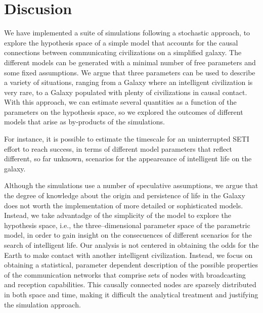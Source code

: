 \documentclass[crop]{CSLB}
\begin{document}
\maketitle




                      




\section{Discusion}\label{S_discussion}

We have implemented a suite of simulations following a stochastic
approach, to explore the hypothesis space of a simple model that
accounts for the causal connections between communicating
civilizations on a simplified galaxy.
%
The different models can be generated with a minimal number of free
parameters and some fixed assumptions.
%
We argue that three parameters can be used to describe a variety of
situations, ranging from a Galaxy where an intelligent civilization is
very rare, to a Galaxy populated with plenty of civilizations in
causal contact.
%
With this approach, we can estimate several quantities as a function
of the parameters on the hypothesis space,
so we explored the outcomes of different models 
that arise as by-products of the simulations.

%
For instance, it is possible to estimate the timescale for an
uninterrupted SETI effort to reach success, in terms of different
model parameters that reflect different, so far unknown, scenarios for
the appeareance of intelligent life on the galaxy.


Although the simulations use a number of speculative assumptions, we
argue that the degree of knowledge about the origin and persistence of
life in the Galaxy does not worth the implementation of more detailed
or sophisticated models.
%
Instead, we take advantadge of the simplicity of the model to explore
the hypothesis space, i.e., the three--dimensional parameter space of
the parametric model, in order to gain insight on the consecuences of
different scenarios for the search of intelligent life.
%
Our analysis is not centered in obtaining the odds for the Earth
to make contact with another intelligent civilization.
%
Instead, we focus on obtaining a statistical, parameter dependent
description of the possible properties of the communication networks
that comprise sets of nodes with broadcasting and reception
capabilities.
%
This causally connected nodes are sparsely distributed in both space
and time, making it difficult the analytical treatment and justifying
the simulation approach.
\end{document}
